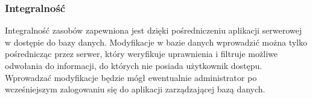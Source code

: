 	\subsubsection{Integralność}
	Integralność zasobów zapewniona jest dzięki pośredniczeniu aplikacji serwerowej w dostępie do bazy danych. Modyfikacje w bazie danych wprowadzić można tylko pośrednicząc przez serwer, który weryfikuje uprawnienia i filtruje możliwe odwołania do informacji, do których nie posiada użytkownik dostępu. Wprowadzać modyfikacje będzie mógł ewentualnie administrator po wcześniejszym zalogowaniu się do aplikacji zarządzającej bazą danych.